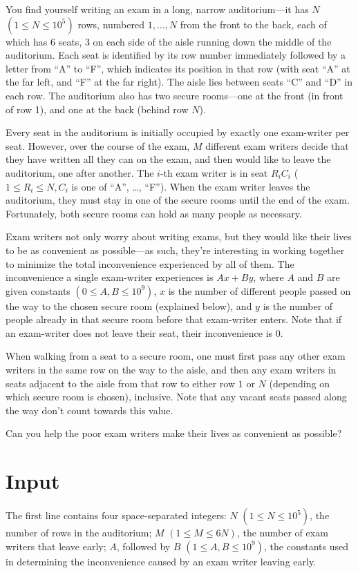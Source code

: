
You find yourself writing an exam in a long, narrow auditorium---it has $N$ $(1 \leq N \leq 10^5)$
rows, numbered $1, \ldots, N$ from the front to the back, each of which has $6$ seats, $3$ on each side
of the aisle running down the middle of the auditorium. Each seat is identified by its row number
immediately followed by a letter from ``A'' to ``F'', which indicates its position in that row (with
seat ``A'' at the far left, and ``F'' at the far right). The aisle lies between seats ``C'' and ``D'' in
each row. The auditorium also has two secure rooms---one at the front (in front of row 1), and one
at the back (behind row $N$).

Every seat in the auditorium is initially occupied by exactly one exam-writer per seat. However,
over the course of the exam, $M$ different exam writers decide that they have written all they can
on the exam, and then would like to leave the auditorium, one after another. The $i$-th exam writer
is in seat $R_iC_i$ ($1 \leq R_i \leq N, C_i$ is one of ``A'', \ldots, ``F''). When the exam writer leaves
the auditorium, they must stay in one of the secure rooms until the end of the exam. Fortunately,
both secure rooms can hold as many people as necessary.

Exam writers not only worry about writing exams, but they would like their lives to be as convenient
as possible---as such, they're interesting in working together to minimize the total inconvenience
experienced by all of them. The inconvenience a single exam-writer experiences is $Ax+By$, where $A$
and $B$ are given constants $(0 \leq A,B \leq 10^9)$, $x$ is the number of different people passed
on the way to the chosen secure room (explained below), and $y$ is the number of people already in
that secure room before that exam-writer enters. Note that if an exam-writer does not leave their
seat, their inconvenience is $0$.

When walking from a seat to a secure room, one must first pass any other exam writers in the same
row on the way to the aisle, and then any exam writers in seats adjacent to the aisle from that row
to either row $1$ or $N$ (depending on which secure room is chosen), inclusive. Note that any vacant
seats passed along the way don't count towards this value.

Can you help the poor exam writers make their lives as convenient as possible?

\section*{Input}
The first line contains four space-separated integers: $N$ $(1 \leq N \leq 10^5)$, the number of rows
in the auditorium; $M$ $(1 \leq M \leq 6N)$, the number of exam writers that leave early; $A$,
followed by $B$ $(1 \leq A,B \leq 10^9)$, the constants used in determining the inconvenience caused
by an exam writer leaving early.

